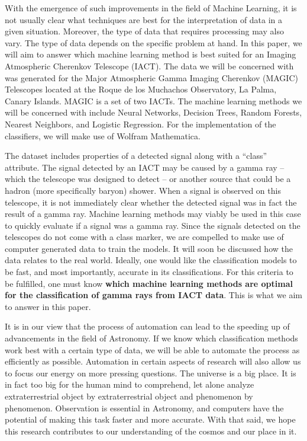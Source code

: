 \documentclass[a4paper, 12pt]{report}
\theoremstyle{definition}
\begin{document}
With the emergence of such improvements in the field of Machine Learning, it is not usually clear what techniques are best for the interpretation of data in a given situation. Moreover, the type of data that requires processing may also vary. The type of data depends on the specific problem at hand. In this paper, we will aim to answer which machine learning method is best suited for an Imaging Atmospheric Cherenkov Telescope (IACT). The data we will be concerned with was generated for the Major Atmospheric Gamma Imaging Cherenkov (MAGIC) Telescopes located at the Roque de los Muchachos Observatory, La Palma, Canary Islands. MAGIC is a set of two IACTs. The machine learning methods we will be concerned with include Neural Networks, Decision Trees, Random Forests, Nearest Neighbors, and Logistic Regression. For the implementation of the classifiers, we will make use of Wolfram Mathematica.

The dataset includes properties of a detected signal along with a \enquote{class} attribute. The signal detected by an IACT may be caused by a gamma ray -- which the telescope was designed to detect -- or another source that could be a hadron (more specifically baryon) shower. When a signal is observed on this telescope, it is not immediately clear whether the detected signal was in fact the result of a gamma ray. Machine learning methods may viably be used in this case to quickly evaluate if a signal was a gamma ray. Since the signals detected on the telescopes do not come with a class marker, we are compelled to make use of computer generated data to train the models. It will soon be discussed how the data relates to the real world.  Ideally, one would like the classification models to be fast, and most importantly, accurate in its classifications. For this criteria to be fulfilled, one must know \textbf{which machine learning methods are optimal for the classification of gamma rays from IACT data}. This is what we aim to answer in this paper.

It is in our view that the process of automation can lead to the speeding up of advancements in the field of Astronomy. If we know which classification methods work best with a certain type of data, we will be able to automate the process as efficiently as possible. Automation in certain aspects of research will also allow us to focus our energy on more pressing questions. The universe is a big place. It is in fact too big for the human mind to comprehend, let alone analyze extraterrestrial object by extraterrestrial object and phenomenon by phenomenon. Observation is essential in Astronomy, and computers have the potential of making this task faster and more accurate. With that said, we hope this research contributes to our understanding of the cosmos and our place in it.
\end{document}
